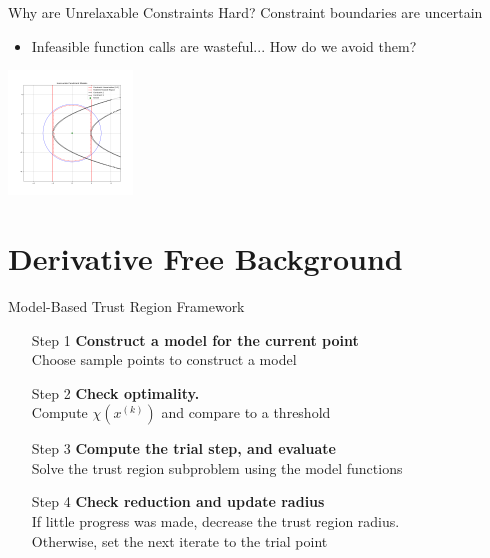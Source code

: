 \documentclass{beamer}
\newcommand{\xk}{{{x}^{(k)}}}
\begin{document}
\begin{frame}{Why are Unrelaxable Constraints Hard?}
	Constraint boundaries are uncertain
	\begin{itemize}
		\item Infeasible function calls are wasteful... How do we avoid them?
	\end{itemize}
	\begin{center}
		\includegraphics[width=125px]{images/modeled_constraints.png}
	\end{center}
\end{frame}




\section{Derivative Free Background}


\begin{frame}{Model-Based Trust Region Framework}
	\begin{itemize}
		\item[Step 1] \textbf{Construct a model for the current point} \\
			Choose sample points to construct a model
		\item[Step 2] \textbf{Check optimality.} \\
			Compute $\chi\left(\xk\right)$ and compare to a threshold
		\item[Step 3] \textbf{Compute the trial step, and evaluate} \\
			Solve the trust region subproblem using the model functions
		\item[Step 4] \textbf{Check reduction and update radius} \\
			If little progress was made, decrease the trust region radius. \\
			Otherwise, set the next iterate to the trial point
	\end{itemize}
\end{frame}
\end{document}
